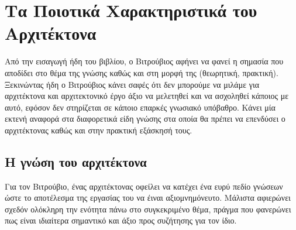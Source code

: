 \section{Τα Ποιοτικά Χαρακτηριστικά του Αρχιτέκτονα}

Από την εισαγωγή ήδη του βιβλίου, ο Βιτρούβιος αφήνει να φανεί η σημασία που αποδίδει στο θέμα της γνώσης καθώς και στη μορφή της (θεωρητική, πρακτική). Ξεκινώντας ήδη ο Βιτρούβιος κάνει σαφές ότι δεν μπορούμε να μιλάμε για αρχιτέκτονα και αρχιτεκτονικό έργο άξιο να μελετηθεί και να ασχοληθεί κάποιος με αυτό, εφόσον δεν στηρίζεται σε κάποιο επαρκές γνωσιακό υπόβαθρο. Κάνει μία εκτενή αναφορά στα διαφορετικά είδη γνώσης στα οποία θα πρέπει να επενδύσει ο αρχιτέκτονας καθώς και στην πρακτική εξάσκησή τους.


\subsection{Η γνώση του αρχιτέκτονα}

Για τον Βιτρούβιο, ένας αρχιτέκτονας οφείλει να κατέχει ένα ευρύ πεδίο γνώσεων ώστε το αποτέλεσμα της εργασίας του να έιναι αξιομνημόνευτο. Μάλιστα αφιερώνει σχεδόν ολόκληρη την ενότητα πάνω στο συγκεκριμένο θέμα, πράγμα που φανερώνει πως είναι ιδιαίτερα σημαντικό και άξιο προς συζήτησης για τον ίδιο.

